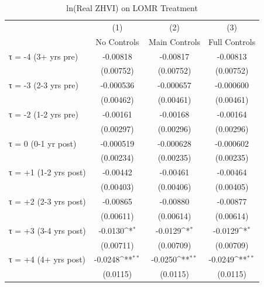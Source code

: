 \begin{table}[htbp]\centering
\def\sym#1{\ifmmode^{#1}\else\(^{#1}\)\fi}
\caption{ln(Real ZHVI) on LOMR Treatment}
\begin{tabular}{l*{3}{c}}
\hline\hline
                    &\multicolumn{1}{c}{(1)}&\multicolumn{1}{c}{(2)}&\multicolumn{1}{c}{(3)}\\
                    &\multicolumn{1}{c}{No Controls}&\multicolumn{1}{c}{Main Controls}&\multicolumn{1}{c}{Full Controls}\\
\hline
τ = -4 (3+ yrs pre) &    -0.00818         &    -0.00817         &    -0.00813         \\
                    &   (0.00752)         &   (0.00752)         &   (0.00752)         \\
[1em]
τ = -3 (2-3 yrs pre)&   -0.000536         &   -0.000657         &   -0.000600         \\
                    &   (0.00462)         &   (0.00461)         &   (0.00461)         \\
[1em]
τ = -2 (1-2 yrs pre)&    -0.00161         &    -0.00168         &    -0.00164         \\
                    &   (0.00297)         &   (0.00296)         &   (0.00296)         \\
[1em]
τ = 0 (0-1 yr post) &   -0.000519         &   -0.000628         &   -0.000602         \\
                    &   (0.00234)         &   (0.00235)         &   (0.00235)         \\
[1em]
τ = +1 (1-2 yrs post)&    -0.00442         &    -0.00461         &    -0.00464         \\
                    &   (0.00403)         &   (0.00406)         &   (0.00405)         \\
[1em]
τ = +2 (2-3 yrs post)&    -0.00865         &    -0.00880         &    -0.00877         \\
                    &   (0.00611)         &   (0.00614)         &   (0.00614)         \\
[1em]
τ = +3 (3-4 yrs post)&     -0.0130\sym{*}  &     -0.0129\sym{*}  &     -0.0129\sym{*}  \\
                    &   (0.00711)         &   (0.00709)         &   (0.00709)         \\
[1em]
τ = +4 (4+ yrs post)&     -0.0248\sym{**} &     -0.0250\sym{**} &     -0.0249\sym{**} \\
                    &    (0.0115)         &    (0.0115)         &    (0.0115)         \\

\end{tabular}
\end{table}
